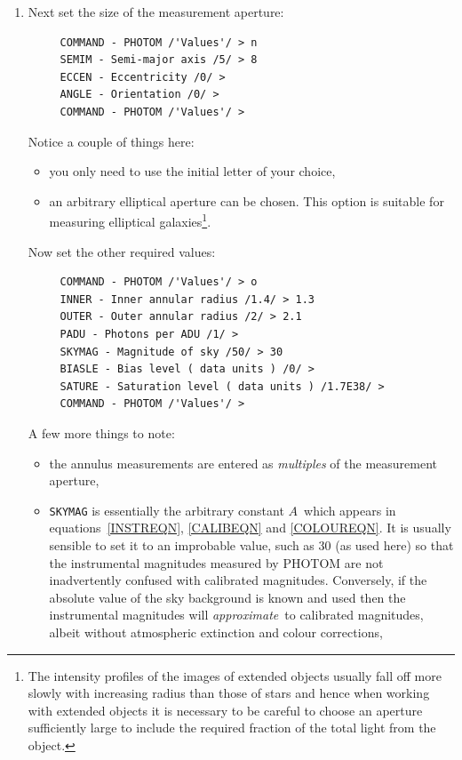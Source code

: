 \documentclass[twoside,11pt]{article}
\begin{document}
\begin{enumerate}
  \item Next set the size of the measurement aperture:

{\samepage
\begin{verbatim}
     COMMAND - PHOTOM /'Values'/ > n
     SEMIM - Semi-major axis /5/ > 8
     ECCEN - Eccentricity /0/ > 
     ANGLE - Orientation /0/ > 
     COMMAND - PHOTOM /'Values'/ > 
\end{verbatim}
}

   Notice a couple of things here:

  \begin{itemize}

    \item you only need to use the initial letter of your choice,

    \item an arbitrary elliptical aperture can be chosen. This option is
     suitable for measuring elliptical galaxies\footnote{The intensity
     profiles of the images of extended objects usually fall off more
     slowly with increasing radius than those of stars and hence when
     working with extended objects it is necessary to be careful to choose
     an aperture sufficiently large to include the required fraction of the
     total light from the object.}.

\end{itemize} 

   Now set the other required values:

\begin{verbatim}
     COMMAND - PHOTOM /'Values'/ > o
     INNER - Inner annular radius /1.4/ > 1.3
     OUTER - Outer annular radius /2/ > 2.1
     PADU - Photons per ADU /1/ > 
     SKYMAG - Magnitude of sky /50/ > 30
     BIASLE - Bias level ( data units ) /0/ > 
     SATURE - Saturation level ( data units ) /1.7E38/ > 
     COMMAND - PHOTOM /'Values'/ > 
\end{verbatim}
 
   A few more things to note:

  \begin{itemize}

    \item the annulus measurements are entered as {\it multiples} of the
     measurement aperture,

    \item {\tt SKYMAG} is essentially the arbitrary constant $A$\,
     which appears in equations~\ref{INSTREQN}, \ref{CALIBEQN} and
     \ref{COLOUREQN}.  It is usually sensible to set it to an
     improbable value, such as 30 (as used here) so that the
     instrumental magnitudes measured by PHOTOM are not inadvertently
     confused with calibrated magnitudes.  Conversely, if the absolute
     value of the sky background is known and used then the instrumental
     magnitudes will {\it approximate}\, to calibrated magnitudes,
     albeit without atmospheric extinction and colour corrections,


\end{itemize}
\end{enumerate}
\end{document}
